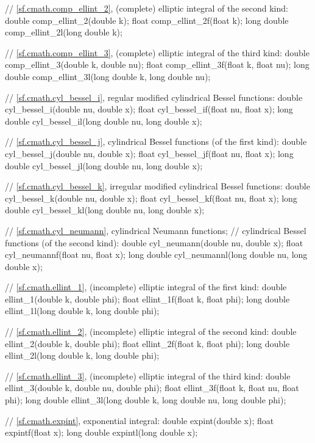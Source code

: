\begin{codeblock}
{  // \ref{sf.cmath.comp_ellint_2}, (complete) elliptic integral of the second kind:
  double       comp_ellint_2(double k);
  float        comp_ellint_2f(float k);
  long double  comp_ellint_2l(long double k);

  // \ref{sf.cmath.comp_ellint_3}, (complete) elliptic integral of the third kind:
  double       comp_ellint_3(double k, double nu);
  float        comp_ellint_3f(float k, float nu);
  long double  comp_ellint_3l(long double k, long double nu);

  // \ref{sf.cmath.cyl_bessel_i}, regular modified cylindrical Bessel functions:
  double       cyl_bessel_i(double nu, double x);
  float        cyl_bessel_if(float nu, float x);
  long double  cyl_bessel_il(long double nu, long double x);

  // \ref{sf.cmath.cyl_bessel_j}, cylindrical Bessel functions (of the first kind):
  double       cyl_bessel_j(double nu, double x);
  float        cyl_bessel_jf(float nu, float x);
  long double  cyl_bessel_jl(long double nu, long double x);

  // \ref{sf.cmath.cyl_bessel_k}, irregular modified cylindrical Bessel functions:
  double       cyl_bessel_k(double nu, double x);
  float        cyl_bessel_kf(float nu, float x);
  long double  cyl_bessel_kl(long double nu, long double x);

  // \ref{sf.cmath.cyl_neumann}, cylindrical Neumann functions;
  // cylindrical Bessel functions (of the second kind):
  double       cyl_neumann(double nu, double x);
  float        cyl_neumannf(float nu, float x);
  long double  cyl_neumannl(long double nu, long double x);

  // \ref{sf.cmath.ellint_1}, (incomplete) elliptic integral of the first kind:
  double       ellint_1(double k, double phi);
  float        ellint_1f(float k, float phi);
  long double  ellint_1l(long double k, long double phi);

  // \ref{sf.cmath.ellint_2}, (incomplete) elliptic integral of the second kind:
  double       ellint_2(double k, double phi);
  float        ellint_2f(float k, float phi);
  long double  ellint_2l(long double k, long double phi);

  // \ref{sf.cmath.ellint_3}, (incomplete) elliptic integral of the third kind:
  double       ellint_3(double k, double nu, double phi);
  float        ellint_3f(float k, float nu, float phi);
  long double  ellint_3l(long double k, long double nu, long double phi);

  // \ref{sf.cmath.expint}, exponential integral:
  double       expint(double x);
  float        expintf(float x);
  long double  expintl(long double x);

}
\end{codeblock}
